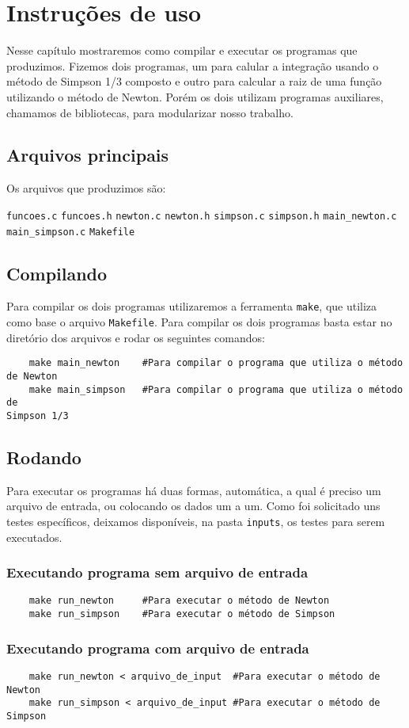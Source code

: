 \chapter{Instruções de uso}
Nesse capítulo mostraremos como compilar e executar os programas que produzimos.
Fizemos dois programas, um para calular a integração usando o método de Simpson
1/3 composto e outro para calcular a raiz de uma função utilizando o método de
Newton. Porém os dois utilizam programas auxiliares, chamamos de bibliotecas,
para modularizar nosso trabalho.

\section{Arquivos principais}
Os arquivos que produzimos são:
	\begin{itemize}
		\texttt{funcoes.c}
		\texttt{funcoes.h}
		\texttt{newton.c}
		\texttt{newton.h}
		\texttt{simpson.c}
		\texttt{simpson.h}
		\texttt{main_newton.c}
		\texttt{main_simpson.c}
		\texttt{Makefile}
	\end{itemize}

\section{Compilando}
Para compilar os dois programas utilizaremos a ferramenta \texttt{make}, que
utiliza como base o arquivo \texttt{Makefile}. Para compilar os dois programas
basta estar no diretório dos arquivos e rodar os seguintes comandos:

\begin{verbatim}
	make main_newton	#Para compilar o programa que utiliza o método de Newton
	make main_simpson	#Para compilar o programa que utiliza o método de
Simpson 1/3
\end{verbatim}

\section{Rodando}
Para executar os programas há duas formas, automática, a qual é preciso um
arquivo de entrada, ou colocando os dados um a um. Como foi solicitado uns
testes específicos, deixamos disponíveis, na pasta \texttt{inputs}, os testes
para serem executados.

\subsection{Executando programa sem arquivo de entrada}
\begin{verbatim}
	make run_newton		#Para executar o método de Newton
	make run_simpson	#Para executar o método de Simpson
\end{verbatim}

\subsection{Executando programa com arquivo de entrada}
\begin{verbatim}
	make run_newton	< arquivo_de_input	#Para executar o método de Newton
	make run_simpson < arquivo_de_input	#Para executar o método de Simpson
\end{verbatim}

